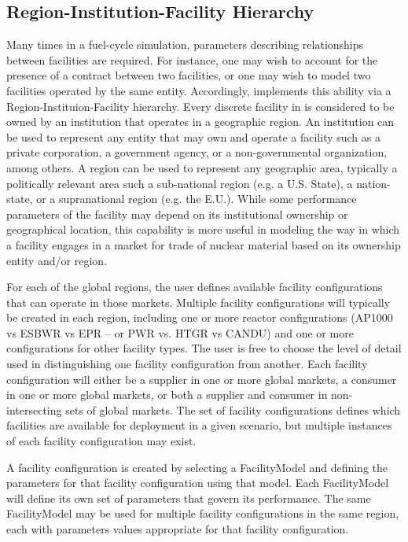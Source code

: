 \subsection{Region-Institution-Facility Hierarchy}

Many times in a fuel-cycle simulation, parameters describing
relationships between facilities are required. For instance, one may
wish to account for the presence of a contract between two facilities,
or one may wish to model two facilities operated by the same
entity. Accordingly, \Cyclus implements this ability via a
Region-Instituion-Facility hierarchy. Every discrete facility in
\Cyclus is considered to be owned by an institution that operates in a
geographic region.  An institution can be used to represent any entity
that may own and operate a facility such as a private corporation, a
government agency, or a non-governmental organization, among others.
A region can be used to represent any geographic area, typically a
politically relevant area such a sub-national region (e.g. a
U.S. State), a nation-state, or a supranational
region (e.g. the E.U.).  While some performance parameters of the
facility may depend on its institutional ownership or geographical
location, this capability is more useful in modeling the way in which
a facility engages in a market for trade of nuclear material based on
its ownership entity and/or region.

For each of the global regions, the user defines available facility 
configurations that can operate in those markets.  Multiple facility 
configurations will typically be created in each region, including one 
or more reactor configurations (AP1000  vs ESBWR vs EPR – or PWR vs.  
HTGR vs CANDU) and one or more configurations for other facility 
types.  The user is free to choose the level of detail used in 
distinguishing one facility configuration from another.  Each facility 
configuration will either be a supplier in one or more global markets, 
a consumer in one or more global markets, or both a supplier and 
consumer in non-intersecting sets of global markets.  The set of 
facility configurations defines which facilities are available for 
deployment in a given scenario, but multiple instances of each 
facility configuration may exist.

A facility configuration is created by selecting a FacilityModel and 
defining the parameters for that facility configuration using that 
model.  Each FacilityModel will define its own set of parameters that 
govern its performance.  The same FacilityModel may be used for 
multiple facility configurations in the same region, each with 
parameters values appropriate for that facility configuration.

